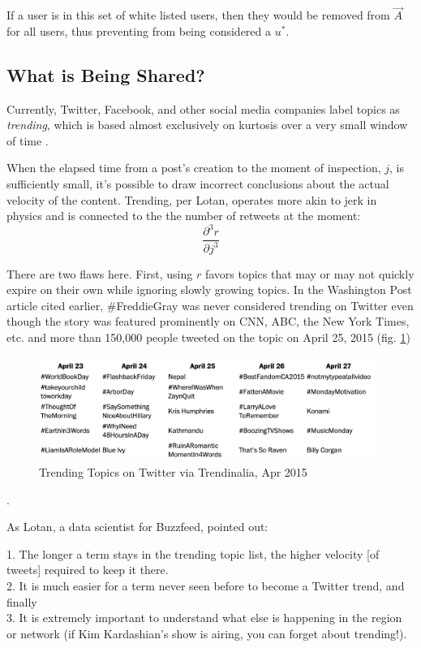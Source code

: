 \documentclass[preprint,review,12pt]{elsarticle}
\begin{document}
If a user is in this set of white listed users, then they would be removed from $\vec{A}$ for all users, thus preventing from being considered a $u^*$.

\subsection{What is Being Shared?}
\label{sec: what is being shared}
Currently, Twitter, Facebook, and other social media companies label topics as \textit{trending}, which is based almost exclusively on kurtosis over a very small window of time \cite{dewey2015freddie,lotan2015freddie}. 

When the elapsed time from a post's creation to the moment of inspection, $j$, is sufficiently small, it's possible to draw incorrect conclusions about the actual velocity of the content. Trending, per Lotan, operates more akin to jerk in physics and is connected to the the number of retweets at the moment: 
\[
    \frac{\partial^3 r}{\partial j^3}
\]

There are two flaws here. First, using $r$ favors topics that may or may not quickly expire on their own while ignoring slowly growing topics. In the Washington Post article cited earlier, \#FreddieGray was never considered trending on Twitter even though the story was featured prominently on CNN, ABC, the New York Times, etc. and more than 150,000 people tweeted on the topic on April 25, 2015 (fig. \ref{img:Trendinalia 2015})
\begin{figure}[htp]
    \centering
    \includegraphics[width=11cm]{Trendinalia Apr, 2015.png}
    \caption{Trending Topics on Twitter via Trendinalia, Apr 2015}
    \label{img:Trendinalia 2015}
\end{figure}
. 

As Lotan, a data scientist for Buzzfeed, pointed out:
\begin{displayquote}
1. The longer a term stays in the trending topic list, the higher velocity [of tweets] required to keep it there. \\
2. It is much easier for a term never seen before to become a Twitter trend, and finally \\
3. It is extremely important to understand what else is happening in the region or network (if Kim Kardashian’s show is airing, you can forget about trending!). \cite{lotan2015freddie}
\end{displayquote}
\end{document}
